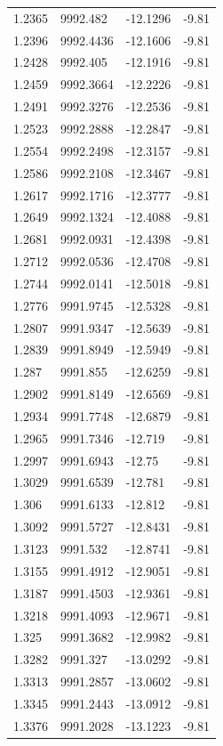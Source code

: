 \begin{table}[H]
\begin{tabular}{llll}
1.2365 & 9992.482 & -12.1296 & -9.81 \\
1.2396 & 9992.4436 & -12.1606 & -9.81 \\
1.2428 & 9992.405 & -12.1916 & -9.81 \\
1.2459 & 9992.3664 & -12.2226 & -9.81 \\
1.2491 & 9992.3276 & -12.2536 & -9.81 \\
1.2523 & 9992.2888 & -12.2847 & -9.81 \\
1.2554 & 9992.2498 & -12.3157 & -9.81 \\
1.2586 & 9992.2108 & -12.3467 & -9.81 \\
1.2617 & 9992.1716 & -12.3777 & -9.81 \\
1.2649 & 9992.1324 & -12.4088 & -9.81 \\
1.2681 & 9992.0931 & -12.4398 & -9.81 \\
1.2712 & 9992.0536 & -12.4708 & -9.81 \\
1.2744 & 9992.0141 & -12.5018 & -9.81 \\
1.2776 & 9991.9745 & -12.5328 & -9.81 \\
1.2807 & 9991.9347 & -12.5639 & -9.81 \\
1.2839 & 9991.8949 & -12.5949 & -9.81 \\
1.287 & 9991.855 & -12.6259 & -9.81 \\
1.2902 & 9991.8149 & -12.6569 & -9.81 \\
1.2934 & 9991.7748 & -12.6879 & -9.81 \\
1.2965 & 9991.7346 & -12.719 & -9.81 \\
1.2997 & 9991.6943 & -12.75 & -9.81 \\
1.3029 & 9991.6539 & -12.781 & -9.81 \\
1.306 & 9991.6133 & -12.812 & -9.81 \\
1.3092 & 9991.5727 & -12.8431 & -9.81 \\
1.3123 & 9991.532 & -12.8741 & -9.81 \\
1.3155 & 9991.4912 & -12.9051 & -9.81 \\
1.3187 & 9991.4503 & -12.9361 & -9.81 \\
1.3218 & 9991.4093 & -12.9671 & -9.81 \\
1.325 & 9991.3682 & -12.9982 & -9.81 \\
1.3282 & 9991.327 & -13.0292 & -9.81 \\
1.3313 & 9991.2857 & -13.0602 & -9.81 \\
1.3345 & 9991.2443 & -13.0912 & -9.81 \\
1.3376 & 9991.2028 & -13.1223 & -9.81 \\

\end{tabular}
\end{table}
